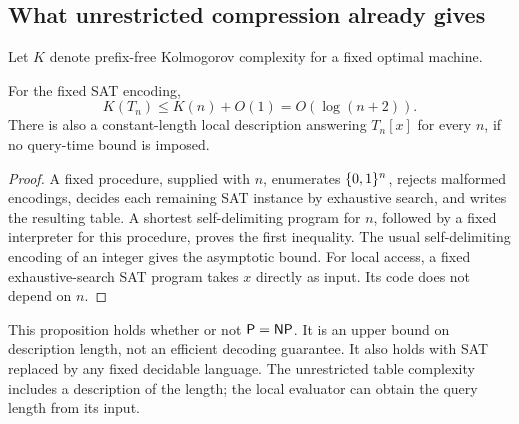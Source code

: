 \subsection{What unrestricted compression already gives}
Let \(K\) denote prefix-free Kolmogorov complexity for a fixed optimal machine.
\begin{proposition}
\label{prop:short}
For the fixed SAT encoding,
\[
 K(T_n)\leq K(n)+O(1)=O(\log(n+2)).
\]
There is also a constant-length local description answering \(T_n[x]\)
for every \(n\), if no query-time bound is imposed.
\end{proposition}
\begin{proof}
A fixed procedure, supplied with \(n\), enumerates \(\{0,1\}^n\), rejects
malformed encodings, decides each remaining SAT instance by exhaustive
search, and writes the resulting table. A shortest self-delimiting
program for \(n\), followed by a fixed interpreter for this procedure,
proves the first inequality. The usual self-delimiting encoding of
an integer gives the asymptotic bound.
For local access, a fixed exhaustive-search SAT program takes \(x\)
directly as input. Its code does not depend on \(n\).
\end{proof}

This proposition holds whether or not \(\mathsf{P}=\mathsf{NP}\). It is an
upper bound on description length, not an efficient decoding guarantee.
It also holds with SAT replaced by any fixed decidable language.
The unrestricted table complexity includes a description of the length;
the local evaluator can obtain the query length from its input.
